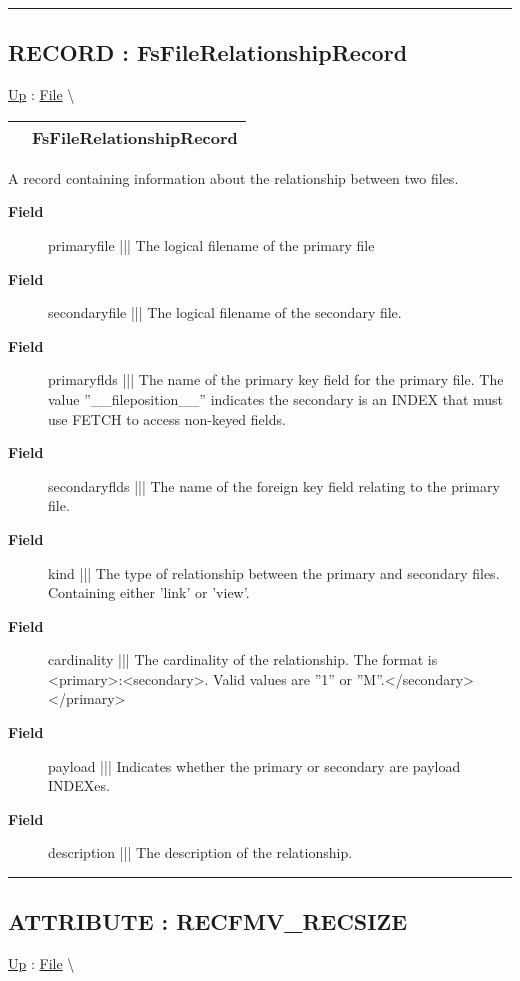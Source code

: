 \rule{\linewidth}{0.5pt}
\subsection*{RECORD : FsFileRelationshipRecord}
\hypertarget{ecldoc:file.fsfilerelationshiprecord}{}
\hyperlink{ecldoc:File}{Up} :
\hspace{0pt} \hyperlink{ecldoc:File}{File} \textbackslash 

{\renewcommand{\arraystretch}{1.5}
\begin{tabularx}{\textwidth}{|>{\raggedright\arraybackslash}l|X|}
\hline
\hspace{0pt} & FsFileRelationshipRecord \\
\hline
\end{tabularx}
}

\par
A record containing information about the relationship between two files.

\par
\begin{description}
\item [\textbf{Field}] primaryfile ||| The logical filename of the primary file
\item [\textbf{Field}] secondaryfile ||| The logical filename of the secondary file.
\item [\textbf{Field}] primaryflds ||| The name of the primary key field for the primary file. The value ''\_\_fileposition\_\_'' indicates the secondary is an INDEX that must use FETCH to access non-keyed fields.
\item [\textbf{Field}] secondaryflds ||| The name of the foreign key field relating to the primary file.
\item [\textbf{Field}] kind ||| The type of relationship between the primary and secondary files. Containing either 'link' or 'view'.
\item [\textbf{Field}] cardinality ||| The cardinality of the relationship. The format is <primary>:<secondary>. Valid values are ''1'' or ''M''.</secondary></primary>
\item [\textbf{Field}] payload ||| Indicates whether the primary or secondary are payload INDEXes.
\item [\textbf{Field}] description ||| The description of the relationship.
\end{description}

\rule{\linewidth}{0.5pt}
\subsection*{ATTRIBUTE : RECFMV\_RECSIZE}
\hypertarget{ecldoc:file.recfmv_recsize}{}
\hyperlink{ecldoc:File}{Up} :
\hspace{0pt} \hyperlink{ecldoc:File}{File} \textbackslash 

